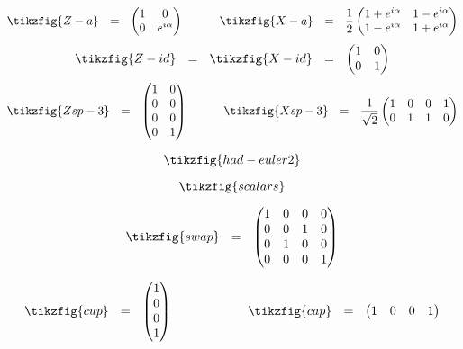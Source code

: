 \documentclass[a4paper,onecolumn,superscriptaddress,11pt,%
				unpublished,%
				allowfontchageintitle,%
				]{quantumarticle}
\begin{document}
\begin{equation*}
\tikzfig{Z-a} \ \ =\ \ \begin{pmatrix} 1 & 0 \\ 0& e^{i\alpha}\end{pmatrix}
\qquad \quad \tikzfig{X-a} \ \ =\ \ \frac12\begin{pmatrix} 1+e^{i\alpha}&   1-e^{i\alpha} \\ 1-e^{i\alpha} & 1+e^{i\alpha}\end{pmatrix}
\end{equation*}
\begin{equation*}
\tikzfig{Z-id}\ \ = \ \ \tikzfig{X-id} \ \ = \ \ \begin{pmatrix}1&0\\0&1\end{pmatrix}
\end{equation*}
\begin{equation*}
\tikzfig{Zsp-3}\ \ = \ \ \begin{pmatrix}1&0\\0&0\\0&0\\0&1\end{pmatrix}
\qquad \quad 
\tikzfig{Xsp-3}\ \ = \ \ \frac{1}{\sqrt{2}}\begin{pmatrix}1&0&0&1\\0&1&1&0\end{pmatrix}
\end{equation*}

\begin{equation*}
	\tikzfig{had-euler2}
\end{equation*}

\begin{equation*}
\tikzfig{scalars}
\end{equation*}

\begin{equation*}
	\tikzfig{swap} \ \ = \ \ \begin{pmatrix}1&0&0&0\\0&0&1&0\\0&1&0&0\\0&0&0&1\end{pmatrix}
\end{equation*}

\begin{equation*}
	\tikzfig{cup} \ \ =\  \ \begin{pmatrix}1\\0\\0\\1\end{pmatrix} \qquad \qquad \qquad\tikzfig{cap} \ \ =\ \ \begin{pmatrix}1&0&0&1\end{pmatrix}
\end{equation*}
\end{document}
